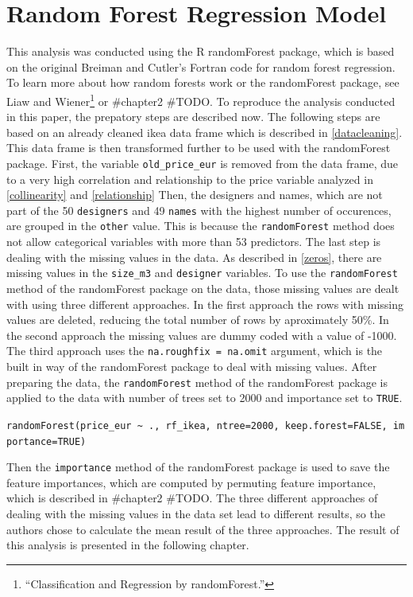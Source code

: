 \documentclass[a4paper, nobind]{templates/ociamthesis}
\begin{document}
\hypertarget{rf}{%
\section{Random Forest Regression Model}\label{rf}}

This analysis was conducted using the R randomForest package, which is based on the original Breiman and Cutler's Fortran code for random forest regression. To learn more about how random forests work or the randomForest package, see Liaw and Wiener\footnote{``Classification and Regression by randomForest.''} or \#chapter2 \#TODO. To reproduce the analysis conducted in this paper, the prepatory steps are described now. The following steps are based on an already cleaned ikea data frame which is described in \ref{datacleaning}. This data frame is then transformed further to be used with the randomForest package.
First, the variable \texttt{old\_price\_eur} is removed from the data frame, due to a very high correlation and relationship to the price variable analyzed in \ref{collinearity} and \ref{relationship} Then, the designers and names, which are not part of the 50 \texttt{designers} and 49 \texttt{names} with the highest number of occurences, are grouped in the \texttt{other} value. This is because the \texttt{randomForest} method does not allow categorical variables with more than 53 predictors. The last step is dealing with the missing values in the data. As described in \ref{zeros}, there are missing values in the \texttt{size\_m3} and \texttt{designer} variables. To use the \texttt{randomForest} method of the randomForest package on the data, those missing values are dealt with using three different approaches. In the first approach the rows with missing values are deleted, reducing the total number of rows by aproximately 50\%. In the second approach the missing values are dummy coded with a value of -1000. The third approach uses the \texttt{na.roughfix\ =\ na.omit} argument, which is the built in way of the randomForest package to deal with missing values.
After preparing the data, the \texttt{randomForest} method of the randomForest package is applied to the data with number of trees set to 2000 and importance set to \texttt{TRUE}.

\texttt{randomForest(price\_eur\ \textasciitilde{}\ .,\ rf\_ikea,\ ntree=2000,\ keep.forest=FALSE,\ importance=TRUE)}

Then the \texttt{importance} method of the randomForest package is used to save the feature importances, which are computed by permuting feature importance, which is described in \#chapter2 \#TODO. The three different approaches of dealing with the missing values in the data set lead to different results, so the authors chose to calculate the mean result of the three approaches. The result of this analysis is presented in the following chapter.
\end{document}
